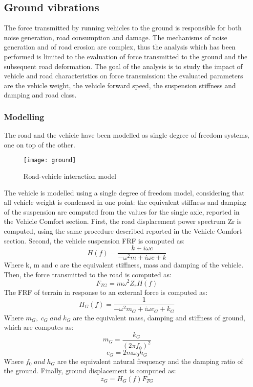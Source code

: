 \documentclass{article}
\begin{document}
\subsection{Ground vibrations}
The force transmitted by running vehicles to the ground is responsible for both noise generation, road consumption and damage. The mechanisms of noise generation and of road erosion are complex, thus the analysis which has been performed is limited to the evaluation of force transmitted to the ground and the subsequent road deformation. The goal of the analysis is to study the impact of vehicle and road characteristics on force transmission: the evaluated parameters are the vehicle weight, the vehicle forward speed, the suspension stiffness and damping and road class. 
\subsubsection{Modelling}
The road and the vehicle have been modelled as single degree of freedom systems, one on top of the other. 
\begin{figure}[H]
\centering
\texttt{[image: ground]}
\caption{Road-vehicle interaction model}
\end{figure}
The vehicle is modelled using a single degree of freedom model, considering that all vehicle weight is condensed in one point: the equivalent stiffness and damping of the suspension are computed from the values for the single axle, reported in the Vehicle Comfort section. First, the road displacement power spectrum Zr is computed, using the same procedure described reported in the Vehicle Comfort section. Second, the vehicle suspension FRF is computed as:
\begin{equation}
H(f)=\frac{k+i\omega c}{-\omega^{2}m+i\omega c+k}
\end{equation}
Where k, m and c are the equivalent stiffness, mass and damping of the vehicle. Then, the force transmitted to the road is computed as: 
\begin{equation}
F_{TG}=m\omega^{2}Z_{r}H(f)
\end{equation}
The FRF of terrain in response to an external force is computed as: 
\begin{equation}
H_{G}(f)=\frac{1}{-\omega^{2}m_{G}+i\omega c_{G}+k_G}
\end{equation}
Where $m_{G},\;c_{G}\;and\;k_{G}$ are the equivalent mass, damping and stiffness of ground, which are computes as: 
\begin{equation}
m_{G}=\frac{k_{G}}{(2\pi f_{0})^{2}}
\end{equation}
\begin{equation}
c_{G}=2m\omega_{0}h_{G}
\end{equation}
Where $f_{0}\;and\;h_{G}$ are the equivalent natural frequency and the damping ratio of the ground. Finally, ground displacement is computed as: 
\begin{equation}
z_{G}=H_{G}(f)F_{TG}
\end{equation}
\end{document}

